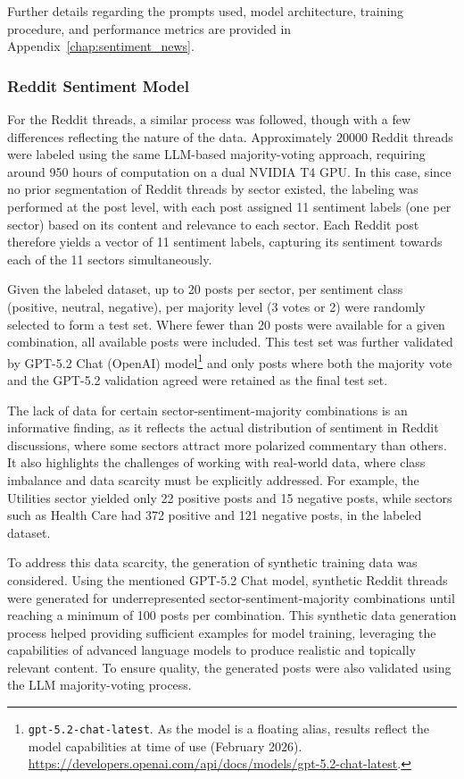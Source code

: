 Further details regarding the prompts used, model architecture, training procedure, and performance metrics are provided in Appendix~\ref{chap:sentiment_news}.

\subsubsection{Reddit Sentiment Model}

For the Reddit threads, a similar process was followed, though with a few differences reflecting the nature of the data. Approximately $\num{20000}$ Reddit threads were labeled using the same LLM-based majority-voting approach, requiring around 950 hours of computation on a dual NVIDIA T4 GPU. In this case, since no prior segmentation of Reddit threads by sector existed, the labeling was performed at the post level, with each post assigned 11 sentiment labels (one per sector) based on its content and relevance to each sector. Each Reddit post therefore yields a vector of 11 sentiment labels, capturing its sentiment towards each of the 11 sectors simultaneously.

Given the labeled dataset, up to 20 posts per sector, per sentiment class (positive, neutral, negative), per majority level (3 votes or 2) were randomly selected to form a test set. Where fewer than 20 posts were available for a given combination, all available posts were included. This test set was further validated by GPT-5.2 Chat (OpenAI) model\footnote{\texttt{gpt-5.2-chat-latest}. As the model is a floating alias, results reflect the model capabilities at time of use (February 2026). \url{https://developers.openai.com/api/docs/models/gpt-5.2-chat-latest}.} and only posts where both the majority vote and the GPT-5.2 validation agreed were retained as the final test set.

The lack of data for certain sector-sentiment-majority combinations is an informative finding, as it reflects the actual distribution of sentiment in Reddit discussions, where some sectors attract more polarized commentary than others. It also highlights the challenges of working with real-world data, where class imbalance and data scarcity must be explicitly addressed. For example, the Utilities sector yielded only 22 positive posts and 15 negative posts, while sectors such as Health Care had 372 positive and 121 negative posts, in the labeled dataset.

To address this data scarcity, the generation of synthetic training data was considered. Using the mentioned GPT-5.2 Chat model, synthetic Reddit threads were generated for underrepresented sector-sentiment-majority combinations until reaching a minimum of 100 posts per combination. This synthetic data generation process helped providing sufficient examples for model training, leveraging the capabilities of advanced language models to produce realistic and topically relevant content. To ensure quality, the generated posts were also validated using the LLM majority-voting process.

